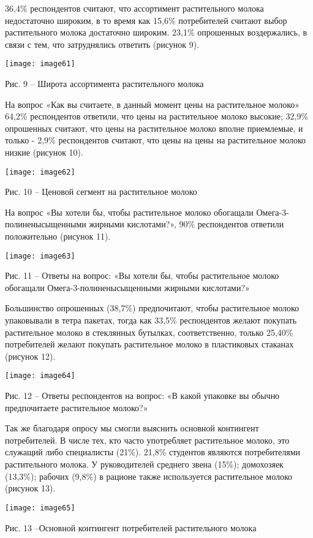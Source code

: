 36,4\% респондентов считают, что ассортимент растительного молока
недостаточно широким, в то время как 15,6\% потребителей считают выбор
растительного молока достаточно широким. 23,1\% опрошенных воздержались,
в связи с тем, что затруднялись ответить (рисунок 9).

\texttt{[image: image61]}

Рис. 9 -- Широта ассортимента растительного молока

На вопрос «Как вы считаете, в данный момент цены на растительное молоко»
64,2\% респондентов ответили, что цены на растительное молоко высокие;
32,9\% опрошенных считают, что цены на растительное молоко вполне
приемлемые, и только - 2,9\% респондентов считают, что цены на цены на
растительное молоко низкие (рисунок 10).

\texttt{[image: image62]}

Рис. 10 -- Ценовой сегмент на растительное молоко

На вопрос «Вы хотели бы, чтобы растительное молоко обогащали
Омега-3-полиненысыщенными жирными кислотами?», 90\% респондентов
ответили положительно (рисунок 11).

\texttt{[image: image63]}

Рис. 11 -- Ответы на вопрос: «Вы хотели бы, чтобы растительное молоко
обогащали Омега-3-полиненысыщенными жирными кислотами?»

Большинство опрошенных (38,7\%) предпочитают, чтобы растительное молоко
упаковывали в тетра пакетах, тогда как 33,5\% респондентов желают
покупать растительное молоко в стеклянных бутылках, соответственно,
только 25,40\% потребителей желают покупать растительное молоко в
пластиковых стаканах (рисунок 12).

\texttt{[image: image64]}

Рис. 12 -- Ответы респондентов на вопрос: «В какой упаковке вы обычно
предпочитаете растительное молоко?»

Так же благодаря опросу мы смогли выяснить основной контингент
потребителей. В числе тех, кто часто употребляет растительное молоко,
это служащий либо специалисты (21\%). 21,8\% студентов являются
потребителями растительного молока. У руководителей среднего звена
(15\%); домохозяек (13,3\%); рабочих (9,8\%) в рационе также
используется растительное молоко (рисунок 13).

\texttt{[image: image65]}

Рис. 13 --Основной контингент потребителей растительного молока

